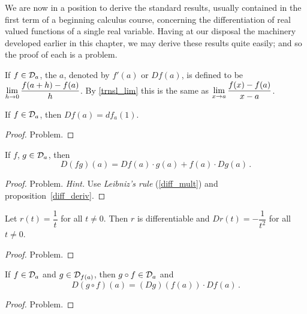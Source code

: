 \begin{prob} We are
now in a position to derive the standard results, usually contained
in the first term of a beginning calculus course, concerning the
differentiation of real valued functions of a single real variable.
Having at our disposal the machinery developed earlier in this
chapter, we may derive these results quite easily; and so the proof
of each is a problem.

\begin{defn} If $f \in \mathcal{D}_a$, the
 $a$, denoted by $f'(a)$ or $Df(a)$, is defined to be ${\displaystyle\lim_{h
\rightarrow 0}\frac{f(a + h) - f(a)}h}$. By \ref{trnsl_lim} this is the same as ${\displaystyle\lim_{x \rightarrow
a}\frac{f(x) - f(a)}{x - a}}$.
\end{defn}

\begin{prop}\label{diff_deriv} If $f \in \mathcal{D}_a$, then $Df(a) = df_a(1)$.
\end{prop}

\begin{proof} Problem.  \ns  \end{proof}

\begin{prop} If $f$, $g \in \mathcal{D}_a$, then
   \[ D(fg)(a) = Df(a) \cdot g(a) + f(a) \cdot Dg(a)\,. \]
\end{prop}

\begin{proof} Problem. \emph{Hint.} Use \emph{Leibniz's rule} (\ref{diff_mult}) and
proposition~\ref{diff_deriv}.  \ns
\end{proof}

\begin{exam}\label{8exam1} Let $r(t) = \dfrac1t$ for all $t \ne 0$. Then $r$ is differentiable
and $Dr(t) = -\dfrac1{t^2}$ for all $t \ne 0$.
\end{exam}

\begin{proof} Problem.  \ns  \end{proof}

\begin{prop}\label{c_ru}  If $f \in \mathcal{D}_a$ and $g \in \mathcal{D}_{f(a)}$, then $g \circ f \in
\mathcal{D}_a$
and
  \[ D(g \circ f)(a) = (Dg)(f(a)) \cdot Df(a)\,. \]
\end{prop}

\begin{proof} Problem. \ns  \end{proof}


\end{prob}
